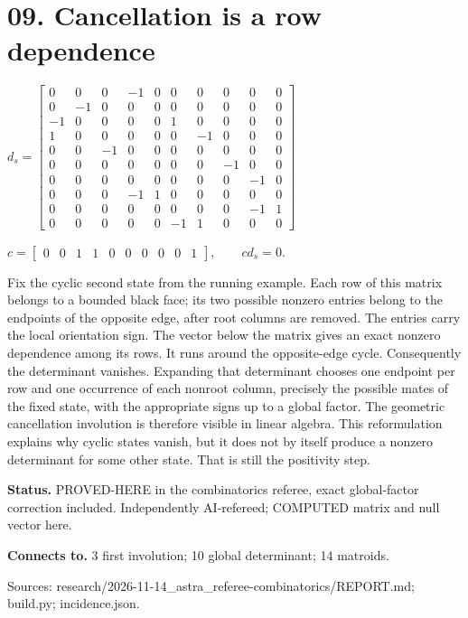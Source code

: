 \section*{09. Cancellation is a row dependence}
\begin{center}\begin{minipage}{.86\textwidth}\centering
$\displaystyle d_s=\left[\begin{matrix}0 & 0 & 0 & -1 & 0 & 0 & 0 & 0 & 0 & 0\\0 & -1 & 0 & 0 & 0 & 0 & 0 & 0 & 0 & 0\\-1 & 0 & 0 & 0 & 0 & 1 & 0 & 0 & 0 & 0\\1 & 0 & 0 & 0 & 0 & 0 & -1 & 0 & 0 & 0\\0 & 0 & -1 & 0 & 0 & 0 & 0 & 0 & 0 & 0\\0 & 0 & 0 & 0 & 0 & 0 & 0 & -1 & 0 & 0\\0 & 0 & 0 & 0 & 0 & 0 & 0 & 0 & -1 & 0\\0 & 0 & 0 & -1 & 1 & 0 & 0 & 0 & 0 & 0\\0 & 0 & 0 & 0 & 0 & 0 & 0 & 0 & -1 & 1\\0 & 0 & 0 & 0 & 0 & -1 & 1 & 0 & 0 & 0\end{matrix}\right]$\par\medskip $\displaystyle c=\left[\begin{matrix}0 & 0 & 1 & 1 & 0 & 0 & 0 & 0 & 0 & 1\end{matrix}\right],\qquad c d_s=0.$
\end{minipage}\end{center}
Fix the cyclic second state from the running example. Each row of this matrix belongs to a bounded black face; its two possible nonzero entries belong to the endpoints of the opposite edge, after root columns are removed. The entries carry the local orientation sign. The vector below the matrix gives an exact nonzero dependence among its rows. It runs around the opposite-edge cycle. Consequently the determinant vanishes. Expanding that determinant chooses one endpoint per row and one occurrence of each nonroot column, precisely the possible mates of the fixed state, with the appropriate signs up to a global factor. The geometric cancellation involution is therefore visible in linear algebra. This reformulation explains why cyclic states vanish, but it does not by itself produce a nonzero determinant for some other state. That is still the positivity step.

\textbf{Status.} PROVED-HERE in the combinatorics referee, exact global-factor correction included. Independently AI-refereed; COMPUTED matrix and null vector here.

\textbf{Connects to.} 3 first involution; 10 global determinant; 14 matroids.

{\footnotesize\raggedright Sources: research/\allowbreak{}2026-11-14\_astra\_referee-combinatorics/\allowbreak{}REPORT.md;\allowbreak{} build.py;\allowbreak{} incidence.json.\par}
